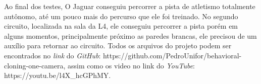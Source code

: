 Ao final dos testes, O Jaguar conseguiu percorrer a pista de atletismo totalmente autônomo, até um pouco mais do percurso que ele foi treinado. No segundo circuito, localizada na sala da L4, ele conseguiu percorrer a pista porém em alguns momentos, principalmente próximo as paredes brancas, ele precisou de um auxílio para retornar ao circuito.
Todos os arquivos do projeto podem ser encontrados no \textit{link} do \textit{GitHub}: https://github.com/PedroUnifor/behavioral-cloning-one-camera, assim como os video no link do \textit{YouTube}:
https://youtu.be/l4X\_hcGPhMY.